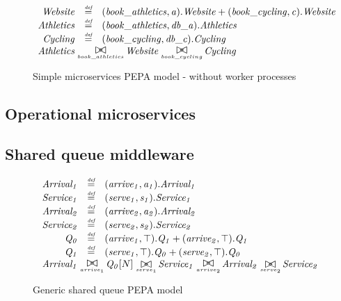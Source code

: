 \begin{figure}
	\caption{Simple microservices PEPA model - without worker processes}
	\centering
\begin{displaymath}
\begin{array}{rcl}
		\mathit{Website} & \rmdef & (\mathit{book\_athletics},\mathit{a}).\mathit{Website}+(\mathit{book\_cycling},\mathit{c}).\mathit{Website}\\
\mathit{Athletics} & \rmdef & (\mathit{book\_athletics},\mathit{db\_a}).\mathit{Athletics}\\
\mathit{Cycling} & \rmdef & (\mathit{book\_cycling},\mathit{db\_c}).\mathit{Cycling}\\
[0.0ex]		\multicolumn{3}{l}{\mathit{Athletics}\sync{book\_athletics}\mathit{Website}\sync{book\_cycling}\mathit{Cycling}}\\
[0.0ex]	\end{array}
\end{displaymath}
\end{figure}

%
%
\subsection{Operational microservices}



%
%
\subsection{Shared queue middleware}

\begin{figure}
	\caption{Generic shared queue PEPA model}
	\centering
	\begin{displaymath}
		\begin{array}{rcl}
			\mathit{Arrival_1} & \rmdef & (\mathit{arrive_1},\mathit{a_1}).\mathit{Arrival_1}\\
			\mathit{Service_1} & \rmdef & (\mathit{serve_1},\mathit{s_1}).\mathit{Service_1}\\
			\mathit{Arrival_2} & \rmdef & (\mathit{arrive_2},\mathit{a_2}).\mathit{Arrival_2}\\
			\mathit{Service_2} & \rmdef & (\mathit{serve_2},\mathit{s_2}).\mathit{Service_2}\\
			\mathit{Q_0} & \rmdef & (\mathit{arrive_1},\top).\mathit{Q_1}+(\mathit{arrive_2},\top).\mathit{Q_1}\\
			\mathit{Q_1} & \rmdef & (\mathit{serve_1},\top).\mathit{Q_0}+(\mathit{serve_2},\top).\mathit{Q_0}\\
	[0.0ex]		\multicolumn{3}{l}{\mathit{Arrival_1}\sync{arrive_1}\mathit{Q_0}[N]\sync{serve_1}\mathit{Service_1}\sync{arrive_2}\mathit{Arrival_2}\sync{serve_2}\mathit{Service_2}}\\
	[0.0ex]	\end{array}
	\end{displaymath}
\end{figure}

